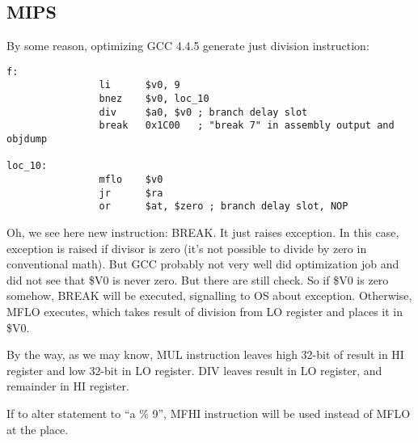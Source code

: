 ﻿\subsection{MIPS}

By some reason, optimizing GCC 4.4.5 generate just division instruction:

\begin{lstlisting}[caption=\Optimizing GCC 4.4.5 (IDA)]
f:
                li      $v0, 9
                bnez    $v0, loc_10
                div     $a0, $v0 ; branch delay slot
                break   0x1C00   ; "break 7" in assembly output and objdump

loc_10:
                mflo    $v0
                jr      $ra
                or      $at, $zero ; branch delay slot, NOP
\end{lstlisting}

Oh, we see here new instruction: BREAK. It just raises exception.
In this case, exception is raised if divisor is zero (it's not possible to divide by zero in conventional
math).
But GCC probably not very well did optimization job and did not see that \$V0 is never zero.
But there are still check.
So if \$V0 is zero somehow, BREAK will be executed, signalling to \ac{OS} about exception.
Otherwise, MFLO executes, which takes result of division from LO register and places it in \$V0.

By the way, as we may know, MUL instruction leaves high 32-bit of result in HI register and low 32-bit
in LO register.
DIV leaves result in LO register, and remainder in HI register.

If to alter statement to ``a \% 9'', MFHI instruction will be used instead of MFLO at the place.
